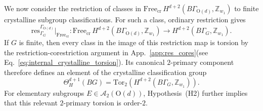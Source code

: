 \documentclass[aps,prx,reprint,superscriptaddress,twocolumn,amsmath,amssymb,amsfonts, nofootinbib]{revtex4-2}
\newcommand{\res}{\text{res}}
\newcommand{\tor}{\text{Tor}}
\newcommand{\Z}{\mathbb{Z}}
\theoremstyle{apsstyle}
\begin{document}
{\bigskip 

We now consider the restriction of classes in $\mathrm{Free}_{\mathrm{cr}}\, H^{d+2}(B\Gamma_{\mathrm{O}(d)},\Z_{w_1})$ to finite crystalline subgroup classifications. For such a class, ordinary restriction gives
\begin{equation*}
\res^{\Gamma_{\mathrm{O}(d)}}_{\Gamma_G}\big|_{\mathrm{Free}_{\mathrm{cr}}}:
\mathrm{Free}_{\mathrm{cr}}\,
H^{d+2}(B\Gamma_{\mathrm{O}(d)},\Z_{w_1}) \longrightarrow H^{d+2}(B\Gamma_G,\Z_{w_1}).
\end{equation*}
If $G$ is finite, then every class in the image of this restriction map is torsion by the restriction-corestriction argument in App.~\ref{app:res_cores}(see Eq.~\eqref{eq:internal_crystalline_torsion}). Its canonical $2$-primary component therefore defines an element of the crystalline classification group
\begin{equation*}
\Theta^{d+1}_{H}(BG) =
\tor_2\left(H^{d+2}(B\Gamma_G,\Z_{w_1})\right).
\end{equation*}
For elementary subgroups $E\in\mathcal A_2(\mathrm{O}(d))$, Hypothesis~{\rm(H2)} further implies that this relevant $2$-primary torsion is order-$2$.

\medskip 

}
\end{document}
